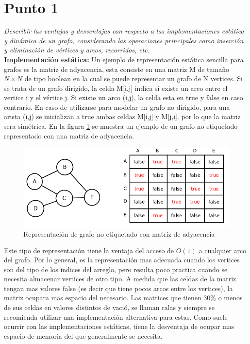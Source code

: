 \section{Punto 1}
\textit{Describir las ventajas y desventajas con respecto a las implementaciones estática y dinámica de un grafo, considerando las operaciones principales como inserción y eliminación de vértices y arcos, recorridos, etc.}\\

\textbf{Implementación estática: }Un ejemplo de representación estática sencilla para grafos es la matriz de adyacencia, esta consiste en una matriz M de tamaño $N \times N$ de tipo boolean en la cual se puede representar un grafo de N vertices. Si se trata de un grafo dirigido, la celda M[i,j] indica si existe un arco entre el vertice i y el vértice j. Si existe un arco (i,j), la celda esta en true y false en caso contrario. En caso de utilizarse para modelar un grafo no dirigido, para una arista (i,j) se inicializan a true ambas celdas M[i,j] y M[j,i]. por lo que la matriz sera simétrica. En la figura \ref{fig:MatrizAdyacencia} se muestra un ejemplo de un grafo no etiquetado representado con una matriz de adyacencia.

\begin{figure}[!htb]
  \centering
  \includegraphics[width=\textwidth, scale=1]{Images/Punto1/MatrizAdyacencia.png}
  \caption{Representación de grafo no etiquetado con matriz de adyacencia}
  \label{fig:MatrizAdyacencia}
\end{figure}

Este tipo de representación tiene la ventaja del acceso de $O(1)$ a cualquier arco del grafo. Por lo general, es la representación mas adecuada cuando los vertices son del tipo de los indices del arreglo, pero resulta poco practica cuando se necesita almacenar vertices de otro tipo. A medida que las celdas de la matriz tengan mas valores false (es decir que tiene pocos arcos entre los vertices), la matriz ocupara mas espacio del necesario. Las matrices que tienen $30\%$ o menos de sus celdas en valores distintos de vació, se llaman ralas y siempre se recomienda utilizar una implementación alternativa para estas. Como suele ocurrir con las implementaciones estáticas, tiene la desventaja de ocupar mas espacio de memoria del que generalmente se necesita.\\


